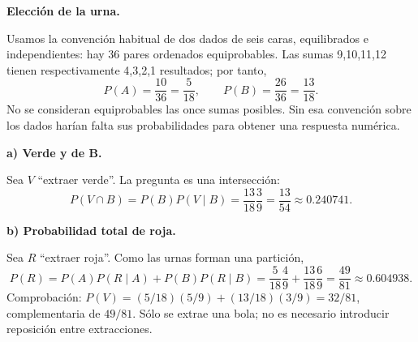 \textbf{Elección de la urna.}\par\nopagebreak[4]
Usamos la convención habitual de dos dados de seis caras, equilibrados e independientes: hay 36 pares ordenados equiprobables. Las sumas 9,10,11,12 tienen respectivamente 4,3,2,1 resultados; por tanto,
\[
P(A)=\frac{10}{36}=\frac5{18},\qquad P(B)=\frac{26}{36}=\frac{13}{18}.
\]
No se consideran equiprobables las once sumas posibles. Sin esa convención sobre los dados harían falta sus probabilidades para obtener una respuesta numérica.

\textbf{a) Verde y de B.}\par\nopagebreak[4]
Sea $V$ ``extraer verde''. La pregunta es una intersección:
\[
P(V\cap B)=P(B)P(V\mid B)
=\frac{13}{18}\frac39=\boxed{\frac{13}{54}\approx0.240741}.
\]

\textbf{b) Probabilidad total de roja.}\par\nopagebreak[4]
Sea $R$ ``extraer roja''. Como las urnas forman una partición,
\[
P(R)=P(A)P(R\mid A)+P(B)P(R\mid B)
=\frac5{18}\frac49+\frac{13}{18}\frac69
=\boxed{\frac{49}{81}\approx0.604938}.
\]
Comprobación: $P(V)=(5/18)(5/9)+(13/18)(3/9)=32/81$, complementaria de $49/81$. Sólo se extrae una bola; no es necesario introducir reposición entre extracciones.
